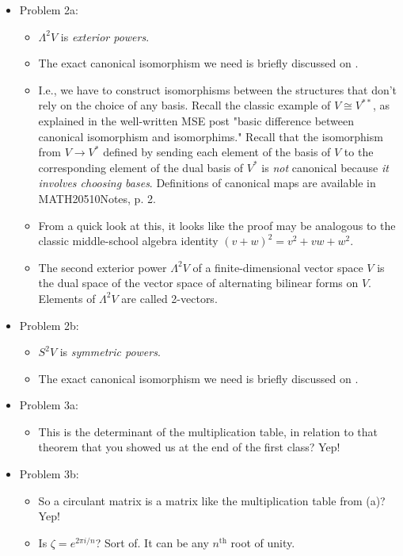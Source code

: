 \documentclass[../notes.tex]{subfiles}
\begin{document}
\begin{itemize}
    \item {}Problem 2a:
    \begin{itemize}
        \item $\Lambda^2V$ is \emph{exterior powers}.
        \item The exact canonical isomorphism we need is briefly discussed on \textcite[473]{bib:FultonHarris}.
        \item I.e., we have to construct isomorphisms between the structures that don't rely on the choice of any basis. Recall the classic example of $V\cong V^{**}$, as explained in the well-written MSE post "basic difference between canonical isomorphism and isomorphims." Recall that the isomorphism from $V\to V^*$ defined by sending each element of the basis of $V$ to the corresponding element of the dual basis of $V^*$ is \emph{not} canonical because \emph{it involves choosing bases}. Definitions of canonical maps are available in MATH20510Notes, p. 2.
        \item From a quick look at this, it looks like the proof may be analogous to the classic middle-school algebra identity $(v+w)^2=v^2+vw+w^2$.
        \item The second exterior power $\Lambda^2V$ of a finite-dimensional vector space $V$ is the dual space of the vector space of alternating bilinear forms on $V$. Elements of $\Lambda^2V$ are called 2-vectors.
    \end{itemize}
    \item Problem 2b:
    \begin{itemize}
        \item $S^2V$ is \emph{symmetric powers}.
        \item The exact canonical isomorphism we need is briefly discussed on \textcite[473]{bib:FultonHarris}.
    \end{itemize}
    \item Problem 3a:
    \begin{itemize}
        \item This is the determinant of the multiplication table, in relation to that theorem that you showed us at the end of the first class? Yep!
    \end{itemize}
    \item Problem 3b:
    \begin{itemize}
        \item So a circulant matrix is a matrix like the multiplication table from (a)? Yep!
        \item Is $\zeta=e^{2\pi i/n}$? Sort of. It can be any $n^\text{th}$ root of unity.

\end{itemize}
\end{itemize}
\end{document}
